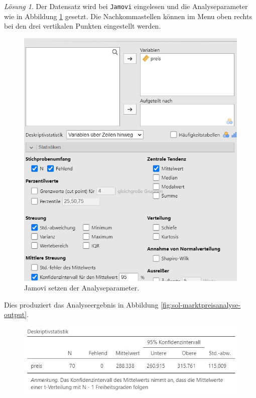 \documentclass[
]{book}
\theoremstyle{definition}
\theoremstyle{definition}
\theoremstyle{definition}
\theoremstyle{definition}
\theoremstyle{remark}
\newtheorem*{solution}{Lösung}
\begin{document}
\begin{solution}
Der Datensatz wird bei \texttt{Jamovi} eingelesen und die Analyseparameter wie in Abbildung \ref{fig:sol-marktpreisanalyse-input} gesetzt. Die Nachkommastellen können im Menu oben rechts bei den drei vertikalen Punkten eingestellt werden.

\begin{figure}

{\centering \includegraphics[width=1\linewidth]{figures/04-exr-marktpreisanalyse-jmv-input} 

}

\caption{Jamovi setzen der Analyseparameter.}\label{fig:sol-marktpreisanalyse-input}
\end{figure}

Dies produziert das Analyseergebnis in Abbildung \ref{fig:sol-marktpreisanalyse-output}.

\begin{figure}

{\centering \includegraphics[width=1\linewidth]{figures/04-exr-marktpreisanalyse-jmv-output} 

}
\end{figure}
\end{solution}
\end{document}
